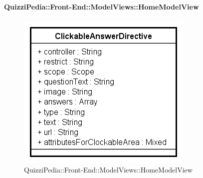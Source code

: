 \paragraph{QuizziPedia::Front-End::ModelViews::HomeModelView}
	
	\label{QuizziPedia::Front-End::ModelViews::HomeModelView}
	
	\begin{figure}[ht]
		\centering
		\includegraphics[scale=0.5,keepaspectratio]{UML/Classi/Front-End/QuizziPedia_Front-end_Templates_ClickableAnswerTemplate.png}
		\caption{QuizziPedia::Front-End::ModelViews::HomeModelView}
	\end{figure} \FloatBarrier
	
